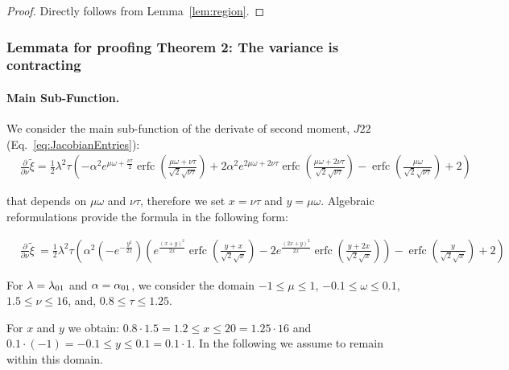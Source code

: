 \documentclass{article}
\newcommand\xinn{{\tilde \xi}}
\renewcommand{\leq}{\leqslant}
\DeclareMathOperator{\erfc}{erfc}
\begin{document}
\begin{proof}
 Directly follows from Lemma~\ref{lem:region}.
\end{proof}









\subsubsection{Lemmata for proofing Theorem 2: The variance is contracting}




\paragraph{Main Sub-Function.}
We consider the main sub-function of the derivate of second moment, $J22$ (Eq.~\eqref{eq:JacobianEntries}):
\begin{align}
&\frac{\partial}{\partial \nu} \xinn= \frac{1}{2} \lambda ^2 \tau \left(- \alpha ^2 e^{\mu \omega+\frac{\nu \tau}{2}} \erfc \left(\frac{\mu \omega+\nu \tau}{\sqrt{2} \sqrt{\nu \tau}}\right) +  
    2 \alpha ^2 e^{2 \mu
    \omega+2 \nu \tau} \erfc \left(\frac{\mu \omega+2
      \nu \tau}{\sqrt{2} \sqrt{\nu
        \tau}}\right)-\erfc \left(\frac{\mu
      \omega}{\sqrt{2} \sqrt{\nu \tau}}\right)+2\right)
\end{align}

that depends on $\mu \omega$ and $\nu \tau$, therefore we 
set  $x=\nu \tau$ and $y=\mu \omega$. Algebraic reformulations provide the 
formula in the following form:

\begin{align}
& \frac{\partial}{\partial\nu}\xinn\ = 
\frac{1}{2}\lambda^{2}\tau
\left(\alpha^{2}\left(-e^{-\frac{y^{2}}{2x}}\right) \left(e^{\frac{(x+y)^{2}}{2x}}\erfc\left(\frac{y+x}{\sqrt{2}\sqrt{x}}\right)-2e^{\frac{(2x+y)^{2}}{2x}}\erfc\left(\frac{y+2x}{\sqrt{2}\sqrt{x}}\right)\right)
- \erfc\left(\frac{y}{\sqrt{2}\sqrt{x}}\right)+ 2\right)
\end{align}

For $\lambda=\lambda_{\rm 01}$ and 
$\alpha=\alpha_{\rm 01}$,
we consider the domain
$-1 \leq \mu \leq 1$, 
$-0.1 \leq \omega \leq 0.1$,
$1.5 \leq \nu \leq 16$, and,
$0.8 \leq \tau \leq 1.25$.

For $x$ and $y$ we obtain: $0.8 \cdot 1.5=1.2 \leq x \leq 20=1.25 \cdot 16$ and 
$0.1 \cdot (-1)= -0.1 \leq y \leq 0.1=0.1 \cdot 1$.
In the following we assume to remain within this domain.
\end{document}
